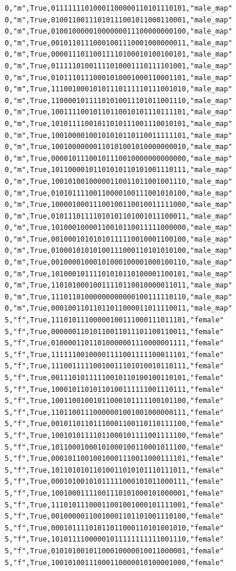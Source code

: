 \documentclass[authoryearcitations]{UoYCSproject}
\begin{document}
\begin{framed}
\begin{verbatim}
0,"m",True,01111111010001100000110101110101,"male_map"
0,"m",True,01001100111010111001011000110001,"male_map"
0,"m",True,01001000001000000011100000000100,"male_map"
0,"m",True,00101101110001001110001000000011,"male_map"
0,"m",True,00001110110011110100010100100101,"male_map"
0,"m",True,01111101001111010001110111101001,"male_map"
0,"m",True,01011101110001010001000110001101,"male_map"
0,"m",True,11100100010101110111110111001010,"male_map"
0,"m",True,11000010111101010011101011001110,"male_map"
0,"m",True,10011110010110110010101110111101,"male_map"
0,"m",True,10101111001011010111001110010101,"male_map"
0,"m",True,10010000100101010110110011111101,"male_map"
0,"m",True,10010000000110101001010000000010,"male_map"
0,"m",True,00001011100101110010000000000000,"male_map"
0,"m",True,10110000101101010110101001110111,"male_map"
0,"m",True,10010100100000110011011001001110,"male_map"
0,"m",True,01010111100110000100111001010100,"male_map"
0,"m",True,10000100011100100110010011111000,"male_map"
0,"m",True,01011101111010101101001011100011,"male_map"
0,"m",True,10100010000110010110011111000000,"male_map"
0,"m",True,00100010101010111110010001100100,"male_map"
0,"m",True,01000101010100111000110101010100,"male_map"
0,"m",True,00100001000101000100001000100110,"male_map"
0,"m",True,10100010111101010110100001100101,"male_map"
0,"m",True,11010100010011110110010000011011,"male_map"
0,"m",True,11101101000000000000100111110110,"male_map"
0,"m",True,00010011011011011000011011110011,"male_map"
5,"f",True,11101011100000100111000111011101,"female"
5,"f",True,00000011010110011011101100110011,"female"
5,"f",True,01000011011010000001110000001111,"female"
5,"f",True,11111100100001111001111100011101,"female"
5,"f",True,11100111110010011101010010110111,"female"
5,"f",True,00111010111110010110100100110101,"female"
5,"f",True,10001011010110100111111001110111,"female"
5,"f",True,10011001001011000101111100101100,"female"
5,"f",True,11011001110000001001001000000111,"female"
5,"f",True,00101101101110001100110110111100,"female"
5,"f",True,10010101111011000101111001111100,"female"
5,"f",True,10110001000101000100110001011100,"female"
5,"f",True,00010110010010001110011000111101,"female"
5,"f",True,10110101011010011010101110111011,"female"
5,"f",True,00010100101011111000101011000111,"female"
5,"f",True,10010001111001110101000101000001,"female"
5,"f",True,11101011100011001001000101111001,"female"
5,"f",True,00100000110010001101101001110100,"female"
5,"f",True,00010111101011011000110101001010,"female"
5,"f",True,10101111000001011111111111001110,"female"
5,"f",True,01010100101100010000010011000001,"female"
5,"f",True,10010100111000110000010100001000,"female"

\end{verbatim}
\end{framed}
\end{document}
